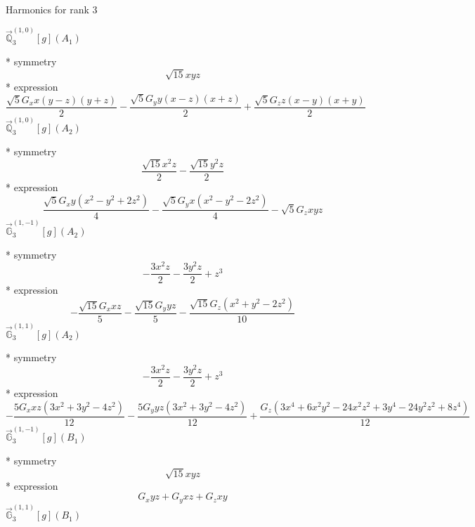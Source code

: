 \documentclass[fleqn,8pt]{jsarticle}
\begin{document}
\noindent * Harmonics for rank 3

\noindent\quad $\vec{\mathbb{Q}}_{3}^{(1,0)}[g](A_{1})$

\noindent\quad ** symmetry
\begin{dmath*}
\sqrt{15} x y z
\end{dmath*}
\noindent\quad ** expression
\begin{dmath*}
\frac{\sqrt{5} G_{x} x \left(y - z\right) \left(y + z\right)}{2} - \frac{\sqrt{5} G_{y} y \left(x - z\right) \left(x + z\right)}{2} + \frac{\sqrt{5} G_{z} z \left(x - y\right) \left(x + y\right)}{2}
\end{dmath*}
\noindent\quad $\vec{\mathbb{Q}}_{3}^{(1,0)}[g](A_{2})$

\noindent\quad ** symmetry
\begin{dmath*}
\frac{\sqrt{15} x^{2} z}{2} - \frac{\sqrt{15} y^{2} z}{2}
\end{dmath*}
\noindent\quad ** expression
\begin{dmath*}
\frac{\sqrt{5} G_{x} y \left(x^{2} - y^{2} + 2 z^{2}\right)}{4} - \frac{\sqrt{5} G_{y} x \left(x^{2} - y^{2} - 2 z^{2}\right)}{4} - \sqrt{5} G_{z} x y z
\end{dmath*}
\noindent\quad $\vec{\mathbb{G}}_{3}^{(1,-1)}[g](A_{2})$

\noindent\quad ** symmetry
\begin{dmath*}
- \frac{3 x^{2} z}{2} - \frac{3 y^{2} z}{2} + z^{3}
\end{dmath*}
\noindent\quad ** expression
\begin{dmath*}
- \frac{\sqrt{15} G_{x} x z}{5} - \frac{\sqrt{15} G_{y} y z}{5} - \frac{\sqrt{15} G_{z} \left(x^{2} + y^{2} - 2 z^{2}\right)}{10}
\end{dmath*}
\noindent\quad $\vec{\mathbb{G}}_{3}^{(1,1)}[g](A_{2})$

\noindent\quad ** symmetry
\begin{dmath*}
- \frac{3 x^{2} z}{2} - \frac{3 y^{2} z}{2} + z^{3}
\end{dmath*}
\noindent\quad ** expression
\begin{dmath*}
- \frac{5 G_{x} x z \left(3 x^{2} + 3 y^{2} - 4 z^{2}\right)}{12} - \frac{5 G_{y} y z \left(3 x^{2} + 3 y^{2} - 4 z^{2}\right)}{12} + \frac{G_{z} \left(3 x^{4} + 6 x^{2} y^{2} - 24 x^{2} z^{2} + 3 y^{4} - 24 y^{2} z^{2} + 8 z^{4}\right)}{12}
\end{dmath*}
\noindent\quad $\vec{\mathbb{G}}_{3}^{(1,-1)}[g](B_{1})$

\noindent\quad ** symmetry
\begin{dmath*}
\sqrt{15} x y z
\end{dmath*}
\noindent\quad ** expression
\begin{dmath*}
G_{x} y z + G_{y} x z + G_{z} x y
\end{dmath*}
\noindent\quad $\vec{\mathbb{G}}_{3}^{(1,1)}[g](B_{1})$
\end{document}
